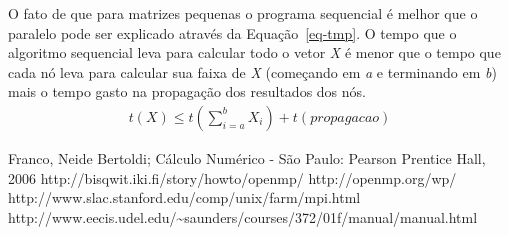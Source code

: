 \documentclass[a4paper]{article}
\begin{document}
\newpage
\indent O fato de que para matrizes pequenas o programa sequencial é melhor que o paralelo pode ser explicado através da Equação~\ref{eq-tmp}. O tempo que o algoritmo sequencial leva para calcular todo o vetor \emph{X} é menor que o tempo que cada nó leva para calcular sua faixa de \emph{X} (começando em \emph{a} e terminando em \emph{b}) mais o tempo gasto na propagação dos resultados dos nós.
\begin{eqnarray} \label{eq-tmp}
	t(X) \le t(\sum_{i=a}^{b}X_i) + t(propagacao)
\end{eqnarray}

\newpage
\begin{thebibliography}{99}
	 Franco, Neide Bertoldi; Cálculo Numérico - São Paulo: Pearson Prentice Hall, 2006
	 http://bisqwit.iki.fi/story/howto/openmp/
	 http://openmp.org/wp/
	 http://www.slac.stanford.edu/comp/unix/farm/mpi.html
	 http://www.eecis.udel.edu/\~{}saunders/courses/372/01f/manual/manual.html
\end{thebibliography}
\end{document}
